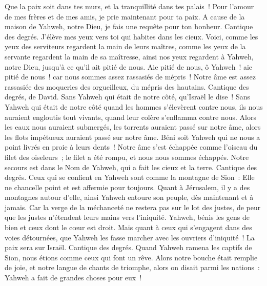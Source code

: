 \begin{multicols}{2}
Que la paix soit dans tes murs, et la tranquillité dans tes palais~!
Pour l'amour de mes frères et de mes amis, je prie maintenant pour ta paix.
A cause de la maison de Yahweh, notre Dieu, je fais une requête pour ton bonheur.
\VerseOne{}Cantique des degrés. J'élève mes yeux vers toi qui habites dans les cieux.
Voici, comme les yeux des serviteurs regardent la main de leurs maîtres, comme les yeux de la servante regardent la main de sa maîtresse, ainsi nos yeux regardent à Yahweh, notre Dieu, jusqu'à ce qu'il ait pitié de nous.
Aie pitié de nous, ô Yahweh~! aie pitié de nous~! car nous sommes assez rassasiés de mépris~!
Notre âme est assez rassasiée des moqueries des orgueilleux, du mépris des hautains.
\VerseOne{}Cantique des degrés, de David. Sans Yahweh qui était de notre côté, qu'Israël le dise~!
Sans Yahweh qui était de notre côté quand les hommes s'élevèrent contre nous,
ils nous auraient engloutis tout vivants, quand leur colère s'enflamma contre nous.
Alors les eaux nous auraient submergés, les torrents auraient passé sur notre âme,
alors les flots impétueux auraient passé sur notre âme.
Béni soit Yahweh qui ne nous a point livrés en proie à leurs dents~!
Notre âme s'est échappée comme l'oiseau du filet des oiseleurs~; le filet a été rompu, et nous nous sommes échappés.
Notre secours est dans le Nom de Yahweh, qui a fait les cieux et la terre.
\VerseOne{}Cantique des degrés. Ceux qui se confient en Yahweh sont comme la montagne de Sion~: Elle ne chancelle point et est affermie pour toujours.
Quant à Jérusalem, il y a des montagnes autour d'elle, ainsi Yahweh entoure son peuple, dès maintenant et à jamais.
Car la verge de la méchanceté ne restera pas sur le lot des justes, de peur que les justes n'étendent leurs mains vers l'iniquité.
Yahweh, bénis les gens de bien et ceux dont le cœur est droit.
Mais quant à ceux qui s'engagent dans des voies détournées, que Yahweh les fasse marcher avec les ouvriers d'iniquité~! La paix sera sur Israël.
\VerseOne{}Cantique des degrés. Quand Yahweh ramena les captifs de Sion, nous étions comme ceux qui font un rêve.
Alors notre bouche était remplie de joie, et notre langue de chants de triomphe, alors on disait parmi les nations~: Yahweh a fait de grandes choses pour eux~!

\end{multicols}

